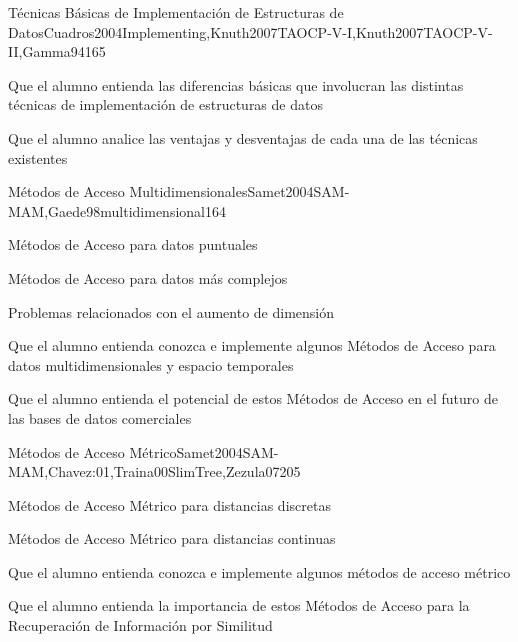 \begin{syllabus}
\begin{unit}{Técnicas Básicas de Implementación de Estructuras de Datos}{Cuadros2004Implementing,Knuth2007TAOCP-V-I,Knuth2007TAOCP-V-II,Gamma94}{16}{5}
   \begin{unitgoals}
         \item Que el alumno entienda las diferencias básicas que involucran las distintas técnicas de implementación de estructuras de datos
         \item Que el alumno analice las ventajas y desventajas de cada una de las técnicas existentes
   \end{unitgoals}
\end{unit}

\begin{unit}{Métodos de Acceso Multidimensionales}{Samet2004SAM-MAM,Gaede98multidimensional}{16}{4}
   \begin{topics}
         \item Métodos de Acceso para datos puntuales
         \item Métodos de Acceso para datos más complejos
         \item Problemas relacionados con el aumento de dimensión
   \end{topics}

   \begin{unitgoals}
         \item Que el alumno entienda conozca e implemente algunos Métodos de Acceso para datos multidimensionales y espacio temporales
         \item Que el alumno entienda el potencial de estos Métodos de Acceso en el futuro de las bases de datos comerciales
   \end{unitgoals}
\end{unit}

\begin{unit}{Métodos de Acceso Métrico}{Samet2004SAM-MAM,Chavez:01,Traina00SlimTree,Zezula07}{20}{5}
   \begin{topics}
         \item Métodos de Acceso Métrico para distancias discretas
         \item Métodos de Acceso Métrico para distancias continuas
   \end{topics}

   \begin{unitgoals}
         \item Que el alumno entienda conozca e implemente algunos métodos de acceso métrico
         \item Que el alumno entienda la importancia de estos Métodos de Acceso para la Recuperación de Información por Similitud
   \end{unitgoals}
\end{unit}


\end{syllabus}
